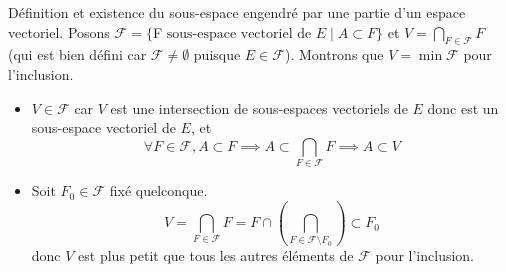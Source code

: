 \documentclass{article}
\begin{document}
\begin{question_kholle}{Définition et existence du sous-espace engendré par une partie d’un espace vectoriel.}
	Posons $\mathcal{F}=\{$F$ \text{ sous-espace vectoriel de } E \mid A\subset F\}$ et $\displaystyle V=\bigcap_{F\in \mathcal{F}}F$ (qui est bien défini car $\mathcal{F}\neq \emptyset$ puisque $E\in\mathcal F$). Montrons que $V=\min \mathcal{F}$ pour l’inclusion.
	\begin{itemize}
		\item $V\in \mathcal{F}$ car $V$ est une intersection de sous-espaces vectoriels de $E$ donc est un sous-espace vectoriel de $E$, et
		      \[
			      \forall F\in \mathcal{F}, A\subset F \implies  A\subset \bigcap_{F\in \mathcal{F}}F \implies A\subset V
		      \]
		\item Soit $F_{0}\in \mathcal{F}$ fixé quelconque.
		      \[
			      V=\bigcap_{F\in \mathcal{F}} F = F \cap \left(\bigcap_{F\in \mathcal{F}\setminus F_{0}}\right)\subset F_{0}
		      \]
		      donc $V$ est plus petit que tous les autres éléments de $\mathcal{F}$ pour l’inclusion.
	\end{itemize}
\end{question_kholle}
\end{document}
